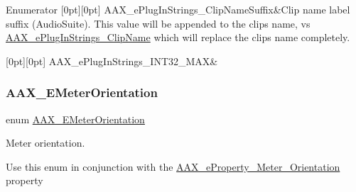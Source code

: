 \begin{DoxyEnumFields}{Enumerator}
[0pt][0pt]{}\mbox{\label{a00491_a86f7310877399d9d4d2ea4863d472476ac2ad5da7b876541a94ca9471193b7195}} 
A\+A\+X\+\_\+e\+Plug\+In\+Strings\+\_\+\+Clip\+Name\+Suffix&Clip name label suffix (Audio\+Suite). This value will be appended to the clip\textquotesingle{}s name, vs \mbox{\hyperlink{a00491_a86f7310877399d9d4d2ea4863d472476ab33b745bc2c47f9c95bad0125ff6c816}{A\+A\+X\+\_\+e\+Plug\+In\+Strings\+\_\+\+Clip\+Name}} which will replace the clip\textquotesingle{}s name completely. \\
\hline

[0pt][0pt]{}\mbox{\label{a00491_a86f7310877399d9d4d2ea4863d472476a1c17b999902a5935eace5487bf483dc4}} 
A\+A\+X\+\_\+e\+Plug\+In\+Strings\+\_\+\+I\+N\+T32\+\_\+\+M\+AX&\\
\hline

\end{DoxyEnumFields}
\mbox{\label{a00491_af260f0f9a6bff0f7bfd3200b2947c96b}} 
\subsubsection{\texorpdfstring{AAX\_EMeterOrientation}{AAX\_EMeterOrientation}}
{\footnotesize\ttfamily enum \mbox{\hyperlink{a00491_af260f0f9a6bff0f7bfd3200b2947c96b}{A\+A\+X\+\_\+\+E\+Meter\+Orientation}}}



Meter orientation. 

Use this enum in conjunction with the \mbox{\hyperlink{a00662_a13e384f22825afd3db6d68395b79ce0da2dc61e2c931c4e28c625611a30d9485d}{A\+A\+X\+\_\+e\+Property\+\_\+\+Meter\+\_\+\+Orientation}} property

